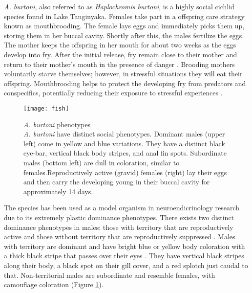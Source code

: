 \documentclass[12pt,twoside]{reedthesis}
\begin{document}
 \textit{A. burtoni}, also referred to as \textit{Haplochromis burtoni}, is a
 highly social cichlid species found in Lake Tanginyaka. Females take part in a offspring care strategy known as mouthbrooding. The female lays eggs and immediately picks them up, storing them in
her buccal cavity. Shortly after this, the males fertilize the eggs. The
mother keeps the offspring in her mouth for about two weeks as the eggs
develop into fry. After the initial release, fry remain close to their mother
and return to their mother's mouth in the presence of danger \citep{renn_maternal_2009}. Brooding
mothers voluntarily starve themselves; however, in stressful situations they
will eat their offspring. Mouthbrooding helps to protect the developing fry from
predators and conspecifics, potentially reducing their exposure to stressful
experiences \citep{renn_maternal_2009}.

\begin{figure}[htbp] 
\begin{centering} 
\texttt{[image: fish]}
\caption[\textit{A. burtoni} phenotypes]{\footnotesize{\textit{A. burtoni} phenotypes
     \citep{fernald_social_2012} \\ \textit{A. burtoni} have distinct social
     phenotypes. Dominant males (upper left) come in yellow and blue variations.
   They have a distinct black eye-bar, vertical black body stripes, and anal fin
   spots. Subordinate males (bottom left) are dull in coloration, similar to
   females.Reproductively active (gravid) females (right) lay their eggs and
   then carry the developing young in their buccal cavity for approximately 14 days.}}
\label{burtoni}
\end{centering} 
\end{figure}

The species has been used as a model organism in neuroendicrinology research due
to its extremely plastic dominance phenotypes. There exists two distinct dominance phenotypes in males:
those with territory that are reproductively active and those without territory
that are reproductively suppressed \citep{fernald_quantitative_1977}. Males with
territory are dominant and have bright blue or yellow body coloration with a thick black
stripe that passes over their eyes \citep{border_color_2019}. They have vertical black stripes along their
body, a black spot on their gill cover, and a red splotch just caudal to that.
Non-territorial males are subordinate and resemble females, with camouflage
coloration (Figure \ref{burtoni}).
\end{document}
